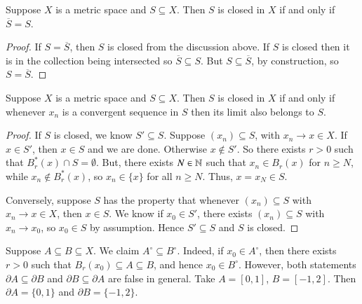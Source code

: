 \begin{prop}
    Suppose $X$ is a metric space and $S \subseteq X$. Then $S$ is closed in $X$ if and only if $\overline{S} = S$.
\end{prop}
\begin{proof}
    If $S = \overline{S}$, then $S$ is closed from the discussion above. If $S$ is closed then it is in the collection being intersected so $\overline{S} \subseteq S$. But $S \subseteq \overline{S}$, by construction, so $S = \overline{S}$.
\end{proof}


\begin{prop}
    Suppose $X$ is a metric space and $S \subseteq X$. Then $S$ is closed in $X$ if and only if whenever $x_n$ is a convergent sequence in $S$ then its limit also belongs to $S$.
\end{prop}
\begin{proof}
    If $S$ is closed, we know $S' \subseteq S$. Suppose $(x_n) \subseteq S$, with $x_n\rightarrow x \in X$. If $x \in S'$, then $x \in S$ and we are done. Otherwise $x \notin S'$. So there exists $r > 0$ such that $B_r^*(x) \cap S = \emptyset$. But, there exists $N \in \mathbb N$ such that $x_n \in B_r(x)$ for $n \geq N$, while $x_n \notin B_r^*(x)$, so $x_n \in \{x\}$ for all $n \geq N$. Thus, $x = x_N \in S$.

    Conversely, suppose $S$ has the property that whenever $(x_n) \subseteq S$ with $x_n \rightarrow x \in X$, then $x \in S$. We know if $x_0 \in S'$, there exists $(x_n) \subseteq S$ with $x_n\rightarrow x_0$, so $x_0 \in S$ by assumption. Hence $S' \subseteq S$ and $S$ is closed.
\end{proof}


\begin{eg}
    Suppose $A \subseteq B \subseteq X$. We claim $A^{\circ}\subseteq B^{\circ}$. Indeed, if $x_0 \in A^{\circ}$, then there exists $r > 0$ such that $B_r(x_0) \subseteq A \subseteq B$, and hence $x_0 \in B^{\circ}$. However, both statements $\partial A \subseteq \partial B$ and $\partial B \subseteq \partial A$ are false in general. Take $A = [0,1]$, $B = [-1,2]$. Then $\partial A = \{0,1\}$ and $\partial B = \{-1,2\}$.
\end{eg}

